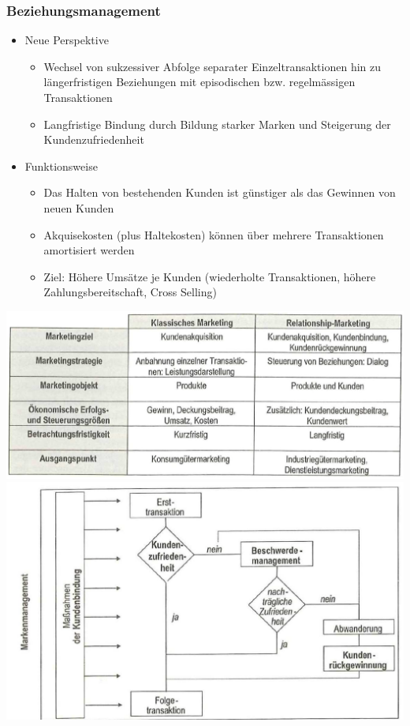 \subsubsection{Beziehungsmanagement}
\begin{itemize}
	\item Neue Perspektive
	\begin{itemize}
		\item Wechsel von sukzessiver Abfolge separater Einzeltransaktionen hin zu längerfristigen Beziehungen mit episodischen bzw. regelmässigen Transaktionen		
		\item Langfristige Bindung durch Bildung starker Marken und Steigerung der Kundenzufriedenheit
	\end{itemize}
	\item Funktionsweise
	\begin{itemize}
		\item Das Halten von bestehenden Kunden ist günstiger als das Gewinnen von neuen Kunden
		\item Akquisekosten (plus Haltekosten) können über mehrere Transaktionen amortisiert werden
		\item Ziel: Höhere Umsätze je Kunden (wiederholte Transaktionen, höhere Zahlungsbereitschaft, Cross Selling)
	\end{itemize}
\end{itemize}
\begin{multicols}{2}
	\includegraphics[width=1\linewidth]{images/beziehungsmanagement}
	\includegraphics[width=1\linewidth]{images/beziehungsmanagement_2}
\end{multicols}

